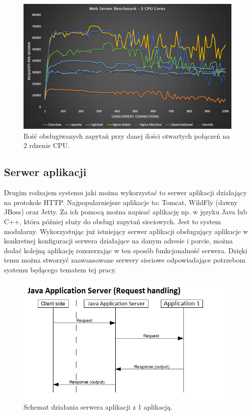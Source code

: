 \documentclass[eng]{mgr}
\begin{document}
			\begin{center}
				\begin{figure}[H]
					\centering
					\includegraphics[scale=0.35]{web-server-performance-benchmark-2-cpu-cores-2.jpg}
					\caption{Ilość obsługiwanych zapytań przy danej ilości otwartych połączeń na 2 rdzenie CPU. \cite{webserverbenchmark}}
				\end{figure}
			\end{center}
		
			\subsection{Serwer aplikacji}
			Drugim rodzajem systemu jaki można wykorzystać to serwer aplikacji działający na protokole HTTP. Najpopularniejsze aplikacje \cite{mostpopularjavaservers} to: Tomcat, WildFly (dawny JBoss) oraz Jetty. Za ich pomocą można napisać aplikację np. w języku Java lub C++, która później służy do obsługi zapytań sieciowych. Jest to system modularny. Wykorzystując już istniejący serwer aplikacji obsługujący aplikacje w konkretnej konfiguracji serwera działające na danym adresie i porcie, można dodać kolejną aplikację rozszerzając w ten sposób funkcjonalność serwera. Dzięki temu można stworzyć zaawansowane serwery sieciowe odpowiadające potrzebom systemu będącego tematem tej pracy.
			
			\begin{center}
				\begin{figure}[H]
					\centering
					\includegraphics[scale=0.8]{flow_jas.png}
					\caption{Schemat działania serwera aplikacji z 1 aplikacją.}
				\end{figure}
			\end{center}
		
\end{document}
